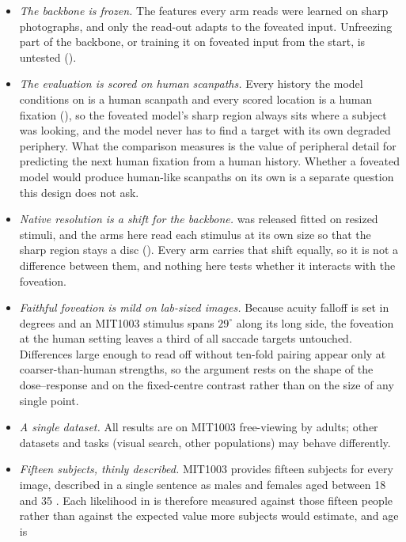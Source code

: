 \begin{itemize}
  \item \emph{The backbone is frozen.} The features every arm reads were learned on sharp photographs,
    and only the read-out adapts to the foveated input. Unfreezing part of the backbone, or training it
    on foveated input from the start, is untested ().
  \item \emph{The evaluation is scored on human scanpaths.} Every history the model conditions on is a
    human scanpath and every scored location is a human fixation (), so the foveated
    model's sharp region always sits where a subject was looking, and the model never has to find a target
    with its own degraded periphery. What the comparison measures is the value of peripheral detail for
    predicting the next human fixation from a human history. Whether a foveated model would produce
    human-like scanpaths on its own is a separate question this design does not ask.
  \item \emph{Native resolution is a shift for the backbone.} \dg{} was released fitted on resized
    stimuli, and the arms here read each stimulus at its own size so that the sharp region stays a disc
    (). Every arm carries that shift equally, so it is not a difference between
    them, and nothing here tests whether it interacts with the foveation.
  \item \emph{Faithful foveation is mild on lab-sized images.}
    Because acuity falloff is set in degrees and an MIT1003 stimulus spans $29^\circ$ along its long
    side, the foveation at the human setting leaves a third of all saccade targets untouched.
    Differences large enough to read off without ten-fold pairing appear only at coarser-than-human
    strengths, so the argument rests on the shape of the dose--response and on the fixed-centre contrast
    rather than on the size of any single point.
  \item \emph{A single dataset.} All results are on MIT1003 free-viewing by adults; other datasets and
    tasks (visual search, other populations) may behave differently.
  \item \emph{Fifteen subjects, thinly described.} MIT1003 provides fifteen subjects for every
    image, described in a single sentence as males and females aged between 18 and 35
    \citep{judd2009mit1003}. Each likelihood in  is therefore measured against those
    fifteen people rather than against the expected value more subjects would estimate, and age is

\end{itemize}
